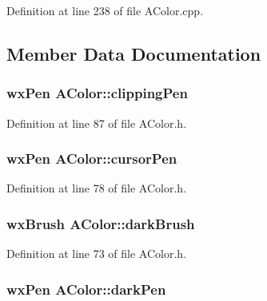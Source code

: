 Definition at line 238 of file A\+Color.\+cpp.



\subsection{Member Data Documentation}
\subsubsection[{\texorpdfstring{clipping\+Pen}{clippingPen}}]{\setlength{\rightskip}{0pt plus 5cm}wx\+Pen A\+Color\+::clipping\+Pen\hspace{0.3cm}{\ttfamily [static]}}\hypertarget{class_a_color_a286c0938ff13836b20bbd8715bcbeacd}{}\label{class_a_color_a286c0938ff13836b20bbd8715bcbeacd}


Definition at line 87 of file A\+Color.\+h.

\subsubsection[{\texorpdfstring{cursor\+Pen}{cursorPen}}]{\setlength{\rightskip}{0pt plus 5cm}wx\+Pen A\+Color\+::cursor\+Pen\hspace{0.3cm}{\ttfamily [static]}}\hypertarget{class_a_color_a53e154a8a01edf9f8fe3c25811bdbef2}{}\label{class_a_color_a53e154a8a01edf9f8fe3c25811bdbef2}


Definition at line 78 of file A\+Color.\+h.

\subsubsection[{\texorpdfstring{dark\+Brush}{darkBrush}}]{\setlength{\rightskip}{0pt plus 5cm}wx\+Brush A\+Color\+::dark\+Brush\hspace{0.3cm}{\ttfamily [static]}}\hypertarget{class_a_color_a090d8f51f09b81eee4b3a2e290591d1b}{}\label{class_a_color_a090d8f51f09b81eee4b3a2e290591d1b}


Definition at line 73 of file A\+Color.\+h.

\subsubsection[{\texorpdfstring{dark\+Pen}{darkPen}}]{\setlength{\rightskip}{0pt plus 5cm}wx\+Pen A\+Color\+::dark\+Pen\hspace{0.3cm}{\ttfamily [static]}}\hypertarget{class_a_color_aacd9bb4146b0a7571c2dbe202cf79a45}{}\label{class_a_color_aacd9bb4146b0a7571c2dbe202cf79a45}


